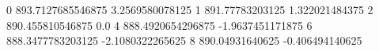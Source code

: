0 893.7127685546875 3.2569580078125
1 891.77783203125 1.322021484375
2 890.455810546875 0.0
4 888.4920654296875 -1.9637451171875
6 888.3477783203125 -2.1080322265625
8 890.04931640625 -0.406494140625
